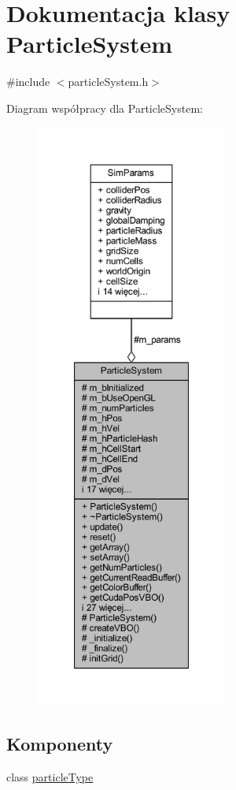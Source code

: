 \hypertarget{class_particle_system}{\section{Dokumentacja klasy Particle\-System}
\label{class_particle_system}
}


{\ttfamily \#include $<$particle\-System.\-h$>$}



Diagram współpracy dla Particle\-System\-:\nopagebreak
\begin{figure}[H]
\begin{center}
\leavevmode
\includegraphics[height=550pt]{class_particle_system__coll__graph}
\end{center}
\end{figure}
\subsection*{Komponenty}
\begin{DoxyCompactItemize}
\item 
class \hyperlink{class_particle_system_1_1particle_type}{particle\-Type}
\end{DoxyCompactItemize}
